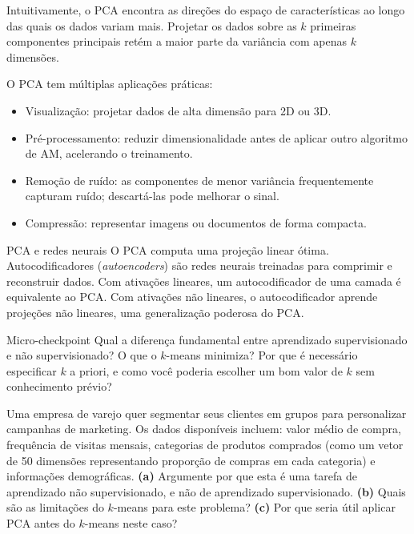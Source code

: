\documentclass[12pt,a4paper]{article}
\begin{document}
Intuitivamente, o PCA encontra as direções do espaço de características ao longo das quais os dados variam mais. Projetar os dados sobre as $k$ primeiras componentes principais retém a maior parte da variância com apenas $k$ dimensões.

O PCA tem múltiplas aplicações práticas:

\begin{itemize}
    \item Visualização: projetar dados de alta dimensão para 2D ou 3D.
    \item Pré-processamento: reduzir dimensionalidade antes de aplicar outro algoritmo de AM, acelerando o treinamento.
    \item Remoção de ruído: as componentes de menor variância frequentemente capturam ruído; descartá-las pode melhorar o sinal.
    \item Compressão: representar imagens ou documentos de forma compacta.
\end{itemize}

\begin{notabox}{PCA e redes neurais}
O PCA computa uma projeção linear ótima. Autocodificadores (\textit{autoencoders}) são redes neurais treinadas para comprimir e reconstruir dados. Com ativações lineares, um autocodificador de uma camada é equivalente ao PCA. Com ativações não lineares, o autocodificador aprende projeções não lineares, uma generalização poderosa do PCA.
\end{notabox}

\begin{checkpointbox}{Micro-checkpoint}
Qual a diferença fundamental entre aprendizado supervisionado e não supervisionado? O que o $k$-means minimiza? Por que é necessário especificar $k$ a priori, e como você poderia escolher um bom valor de $k$ sem conhecimento prévio?
\end{checkpointbox}

\begin{perguntabox}
Uma empresa de varejo quer segmentar seus clientes em grupos para personalizar campanhas de marketing. Os dados disponíveis incluem: valor médio de compra, frequência de visitas mensais, categorias de produtos comprados (como um vetor de 50 dimensões representando proporção de compras em cada categoria) e informações demográficas. \textbf{(a)} Argumente por que esta é uma tarefa de aprendizado não supervisionado, e não de aprendizado supervisionado. \textbf{(b)} Quais são as limitações do $k$-means para este problema? \textbf{(c)} Por que seria útil aplicar PCA antes do $k$-means neste caso?
\end{perguntabox}
\end{document}
